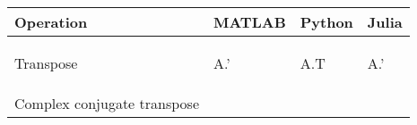 \documentclass[10pt, landscape]{article}
\newenvironment{Shaded}{}{}
\newcommand{\NormalTok}[1]{{#1}}
\begin{document}
\begin{multicols*}{2}
\begin{table}[ht]
\begin{tabular}[ ]{@{}llll@{}}
\toprule
\begin{minipage}[b]{0.24\columnwidth}\raggedright\strut
Operation\strut
\end{minipage} & \begin{minipage}[b]{0.23\columnwidth}\raggedright\strut
MATLAB\strut
\end{minipage} & \begin{minipage}[b]{0.20\columnwidth}\raggedright\strut
Python\strut
\end{minipage} & \begin{minipage}[b]{0.20\columnwidth}\raggedright\strut
Julia\strut
\end{minipage}\tabularnewline
\midrule
\begin{minipage}[t]{0.24\columnwidth}\raggedright\strut
Transpose\strut
\end{minipage} & \begin{minipage}[t]{0.23\columnwidth}\raggedright\strut
\begin{Shaded}
\begin{Highlighting}[]
\NormalTok{A.'}
\end{Highlighting}
\end{Shaded}
\strut
\end{minipage} & \begin{minipage}[t]{0.20\columnwidth}\raggedright\strut
\begin{Shaded}
\begin{Highlighting}[]
\NormalTok{A.T}
\end{Highlighting}
\end{Shaded}
\strut
\end{minipage} & \begin{minipage}[t]{0.20\columnwidth}\raggedright\strut
\begin{Shaded}
\begin{Highlighting}[]
\NormalTok{A.'}
\end{Highlighting}
\end{Shaded}
\strut
\end{minipage}\tabularnewline
\begin{minipage}[t]{0.24\columnwidth}\raggedright\strut
Complex conjugate transpose\strut
\end{minipage} & \begin{minipage}[t]{0.23\columnwidth}\raggedright\strut
\begin{Shaded}
\begin{Highlighting}[]

\end{Highlighting}
\end{Shaded}
\end{minipage}
\end{tabular}
\end{table}
\end{multicols*}
\end{document}
